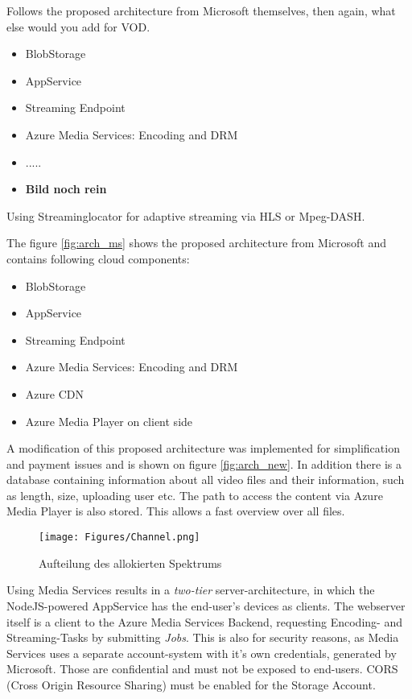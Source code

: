 Follows the proposed architecture from Microsoft themselves\cite{azVODArchitecture}, then again, what else would you add for VOD.
\begin{itemize}
    \item BlobStorage
    \item AppService
    \item Streaming Endpoint
    \item Azure Media Services: Encoding and DRM
    \item  .....
    \item   \textbf{Bild noch rein}
\end{itemize}
Using Streaminglocator for adaptive streaming via HLS or Mpeg-DASH. 

The figure \ref{fig:arch_ms} shows the proposed architecture from Microsoft and contains following cloud components:
\begin{itemize}
    \item BlobStorage
    \item AppService
    \item Streaming Endpoint
    \item Azure Media Services: Encoding and DRM
    \item Azure CDN
    \item Azure Media Player on client side
\end{itemize}
A modification of this proposed architecture was implemented for simplification and payment issues and is shown on figure \ref{fig:arch_new}. In addition there is a database containing information about all video files and their information, such as length, size, uploading user etc. The path to access the content via Azure Media Player is also stored. This allows a fast overview over all files.
\begin{figure}[ht]
    \centering
    \texttt{[image: Figures/Channel.png]}
    \caption{Aufteilung des allokierten Spektrums}
    \label{Channeling}
  \end{figure}

Using Media Services results in a \textit{two-tier} server-architecture, in which the NodeJS-powered AppService has the end-user's devices as clients. The webserver itself is a client to the Azure Media Services Backend, requesting Encoding- and Streaming-Tasks by submitting \textit{Jobs}. This is also for security reasons, as Media Services uses a separate account-system with it's own credentials, generated by Microsoft. Those are confidential and must not be exposed to end-users. CORS (Cross Origin Resource Sharing) must be enabled for the Storage Account. 

